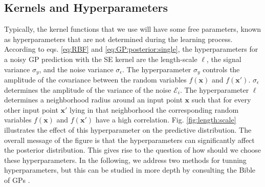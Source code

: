 \documentclass[10pt]{article}
\theoremstyle{definition}
\begin{document}
\subsection{Kernels and Hyperparameters}
Typically, the kernel functions that we use will have some free parameters, known as hyperparameters that are not determined during the learning process. According to eqs. \eqref{eq:RBF} and \eqref{eq:GP:posterior:single}, the hyperparameters for a noisy GP prediction with the SE kernel are the length-scale $\ell$, the signal variance $\sigma_y$, and the noise variance $\sigma_{\epsilon}$.  The hyperparameter $\sigma_y$ controls the amplitude of the covariance between the random variables $f(\mathbf{x})$ and $f(\mathbf{x}')$. $\sigma_{\epsilon}$ determines the amplitude of the variance of the noise $\mathcal{E}_i$. The hyperparameter $\ell$ determines a neighborhood radius around an input point $\mathbf{x}$ such that for every other input point $\mathbf{x}'$ lying in that neighborhood the corresponding random variables $f(\mathbf{x})$ and $f(\mathbf{x}')$ have a high correlation. Fig. \ref{fig:length:scale} illustrates the effect of this hyperparameter on the predictive distribution. The overall message of the figure is that the hyperparameters can significantly affect the posterior distribution. This gives rise to the question of how should we choose these hyperparameters. In the following, we address two methods for tunning hyperparameters, but this can be studied in more depth by consulting the Bible of GPs \cite[Chapter 5]{Rasmussen2006}.
\end{document}
